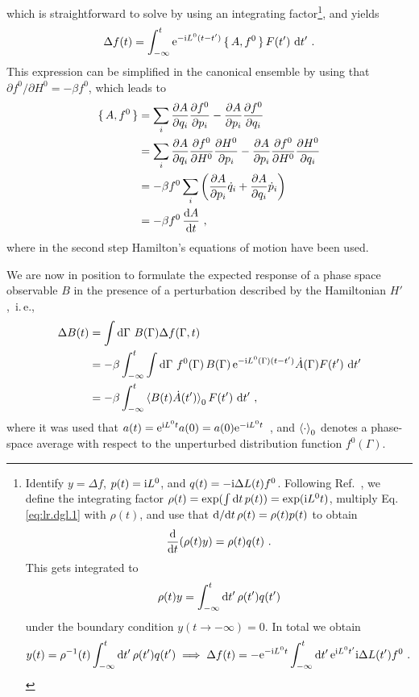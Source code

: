 which is straightforward to solve by using an integrating factor\footnote{Identify $y = \Delta f$, $p(t) = {\rm i} L^0$, and $q(t) = - {\rm i} \Delta L (t) f^0$. Following Ref.~\cite[p.\,68]{Lomen1986}, we define the integrating factor \mbox{$\rho (t) = \exp(\int {\rm d} t \, p (t)) = \exp ({\rm i} L^0 t)$}, multiply Eq.\,\eqref{eq:lr.dgl.1} with $\rho (t)$, and use that \mbox{${\rm d}/{\rm d} t \, \rho(t) = \rho(t) p(t)$} to obtain
  $$
  \frac{{\rm d}}{{\rm d} t} (\rho (t) y) = \rho(t) q(t)~.
  $$
  This gets integrated to
  $$
  \rho(t) y = \int_{-\infty}^t {\rm d} t' \, \rho(t') q(t')
  $$
  under the boundary condition $y (t \to -\infty) = 0$. In total we obtain
  $$
  y(t) = \rho^{-1} (t) \int_{-\infty}^t {\rm d} t' \, \rho(t') q(t')
  \implies
  \Delta f(t) 
    = - {\rm e}^{- {\rm i} L^0 t}  \int_{-\infty}^t {\rm d} t' \, {\rm e}^{{\rm i} L^0 t'} {\rm i} \Delta L (t') f^0~.
  $$
  }, and yields~\cite{Kubo1957a}
\begin{align}
  \Delta f (t) 
    = \int_{-\infty}^t {\rm e}^{-{\rm i} L^0 (t - t')} \set{A, f^0} F(t')~{\rm d} t'~.
  \label{eq:lr.df(t)}
\end{align}
This expression can be simplified in the canonical ensemble by using that \mbox{$\partial f^0 / \partial H^0 = -\beta f^0$}, which leads to
\begin{align*}
  \set{A, f^0}
    &= \sum_i \frac{\partial A}{\partial q_i} \frac{\partial f^0}{\partial p_i}
    - \frac{\partial A}{\partial p_i} \frac{\partial f^0}{\partial q_i} \\
    &= \sum_i \frac{\partial A}{\partial q_i} \frac{\partial f^0}{\partial H^0} \frac{\partial H^0}{\partial p_i}
    - \frac{\partial A}{\partial p_i} \frac{\partial f^0}{\partial H^0} \frac{\partial H^0}{\partial q_i} \\
    &= -\beta f^0 \sum_i
      \left( \frac{\partial A}{\partial p_i} \dot{q}_i +  \frac{\partial A}{\partial q_i} \dot{p}_i \right) \\
    &= -\beta f^0 \, \frac{{\rm d} A}{{\rm d} t}~,
\end{align*}
where in the second step Hamilton's equations of motion have been used.

We are now in position to formulate the expected response of a phase space observable $B$ in the presence of a perturbation described by the Hamiltonian $H'$,~i.\,e.,~
\begin{align}
  \Delta B (t) 
    &= \int {\rm d} \Gamma ~  B (\Gamma) \Delta f (\Gamma, t) \\
    &= - \beta \int_{-\infty}^t 
      \int {\rm d} \Gamma ~ f^0(\Gamma) \, 
       B (\Gamma) \, {\rm e}^{-{\rm i} L^0 (\Gamma) (t - t')} \dot{A}(\Gamma) F(t') ~ {\rm d} t' \\
    &= - \beta \int_{-\infty}^t 
      \braket{B(t) \dot{A}(t')}_0 F(t') ~ {\rm d} t'~,
  \label{eq:lr.dB}
\end{align}
where it was used that $a(t) = {\rm e}^{{\rm i} L^0 t} a(0) = a(0) {\rm e}^{-{\rm i} L^0 t}$~\cite[p.\,498]{Tuckerman}, and $\braket{\cdot}_0$ denotes a phase-space average with respect to the unperturbed distribution function $f^0 (\Gamma)$.

